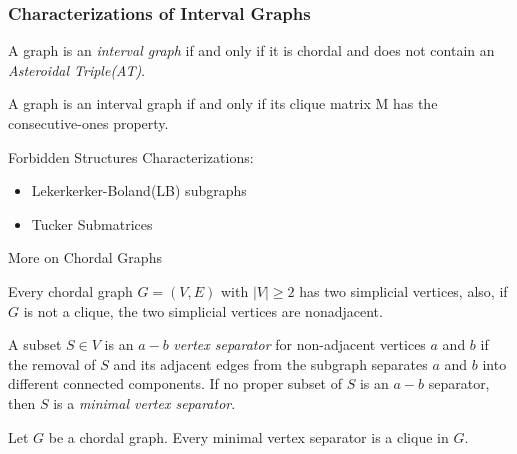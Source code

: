 \documentclass{beamer}
\begin{document}
\begin{frame}
	\frametitle{Characterizations of Interval Graphs}
	
    A graph is an \emph{interval graph} if and only if it is chordal and does not contain an \emph{Asteroidal Triple(AT)}.
	
	\vspace{0.1in}
	
	A graph is an interval graph if and only if its clique matrix M has the consecutive-ones property.
	
	\vspace{0.1in}
	
	\vspace{0.1in}
	 
	Forbidden Structures Characterizations:
	\begin{itemize}
	    \item Lekerkerker-Boland(LB) subgraphs
	    \item Tucker Submatrices
	\end{itemize}

\end{frame}

\begin{frame}{More on Chordal Graphs}
    
\begin{theorem}
Every chordal graph $G= (V,E)$ with $|V| \ge 2$ has two simplicial vertices, also, if $G$ is not a clique, the two simplicial vertices are nonadjacent.
\end{theorem}

\begin{definition}
A subset $S\in V$ is an $a-b$ \emph{vertex separator} for non-adjacent vertices $a$ and $b$ if the removal of $S$ and its adjacent edges from the subgraph separates $a$ and $b$ into different connected components. If no proper subset of $S$ is an $a-b$ separator, then $S$ is a \emph{minimal vertex separator}.
\end{definition}

\begin{lemma}
\label{lemma_separator}
Let $G$ be a chordal graph. Every minimal vertex separator is a clique in $G$.
\end{lemma}

\vspace{0.1in}

\end{frame}
\end{document}
